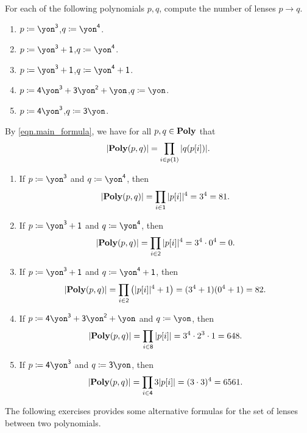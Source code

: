 \documentclass[Book-Poly]{subfiles}
\begin{document}
\begin{exercise}
For each of the following polynomials $p,q$, compute the number of lenses $p\to q$.
\begin{enumerate}
	\item $p\coloneqq\yon^\3$,\quad $q\coloneqq\yon^\4$.
	\item $p\coloneqq\yon^\3+\1$,\quad $q\coloneqq\yon^\4$.
	\item $p\coloneqq\yon^\3+\1$,\quad $q\coloneqq\yon^\4+\1$.
	\item $p\coloneqq\4\yon^\3+\3\yon^\2+\yon$,\quad $q\coloneqq\yon$.
	\item $p\coloneqq\4\yon^\3$,\quad $q\coloneqq\3\yon$.
\qedhere
\end{enumerate}
\begin{solution}
By \eqref{eqn.main_formula}, we have for all $p,q\in\mathbf{Poly}$ that
\[
    |\mathbf{Poly}(p,q)| = \prod_{i\in p(\textsf{1})}|q(p[i])|.
\]
\begin{enumerate}
	\item If $p\coloneqq\yon^\3$ and $q\coloneqq\yon^\4$, then
	\[
	    |\mathbf{Poly}(p,q)| = \prod_{i\in\textsf{1}}|p[i]|^4 = 3^4 = 81.
	\]
	\item If $p\coloneqq\yon^\3+\1$ and $q\coloneqq\yon^\4$, then
	\[
	    |\mathbf{Poly}(p,q)| = \prod_{i\in\textsf{2}}|p[i]|^4 = 3^4\cdot0^4 = 0.
	\]
	\item If $p\coloneqq\yon^\3+\1$ and $q\coloneqq\yon^\4+\1$, then
	\[
	    |\mathbf{Poly}(p,q)| = \prod_{i\in\textsf{2}}\left(|p[i]|^4+1\right) = (3^4 + 1)(0^4 + 1) = 82.
	\]
	\item If $p\coloneqq\4\yon^\3+\3\yon^\2+\yon$ and $q\coloneqq\yon$, then
	\[
	    |\mathbf{Poly}(p,q)| = \prod_{i\in\textsf{8}}|p[i]| = 3^4\cdot2^3\cdot1 = 648.
	\]
	\item If $p\coloneqq\4\yon^\3$ and $q\coloneqq\3\yon$, then
	\[
	    |\mathbf{Poly}(p,q)| = \prod_{i\in\textsf{4}}3|p[i]| = (3\cdot3)^4 = 6561.
	\]
\qedhere
\end{enumerate}
\end{solution}
\end{exercise}

The following exercises provides some alternative formulas for the set of lenses between two polynomials.
\end{document}

